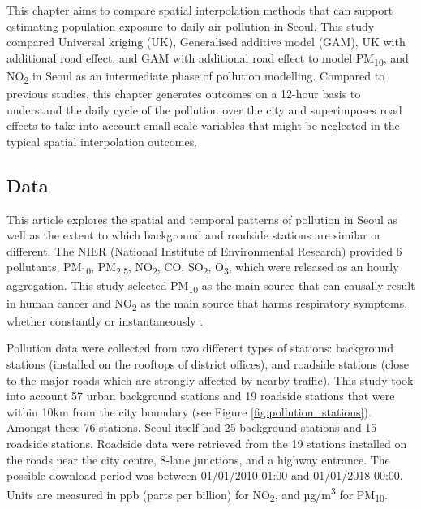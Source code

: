 This chapter aims to compare spatial interpolation methods that can
support estimating population exposure to daily air pollution in Seoul.
This study compared Universal kriging (UK), Generalised additive model
(GAM), UK with additional road effect, and GAM with additional road
effect to model PM\textsubscript{10}, and NO\textsubscript{2} in Seoul
as an intermediate phase of pollution modelling. Compared to previous
studies, this chapter generates outcomes on a 12-hour basis to
understand the daily cycle of the pollution over the city and
superimposes road effects to take into account small scale variables
that might be neglected in the typical spatial interpolation outcomes.

\hypertarget{data}{%
\subsection{Data}\label{data}}

This article explores the spatial and temporal patterns of pollution in
Seoul as well as the extent to which background and roadside stations
are similar or different. The NIER (National Institute of Environmental
Research) provided 6 pollutants, PM\textsubscript{10},
PM\textsubscript{2.5}, NO\textsubscript{2}, CO, SO\textsubscript{2},
O\textsubscript{3}, which were released as an hourly aggregation. This
study selected PM\textsubscript{10} as the main source that can causally
result in human cancer and NO\textsubscript{2} as the main source that
harms respiratory symptoms, whether constantly or instantaneously
\citep{WHO2013}.

Pollution data were collected from two different types of stations:
background stations (installed on the rooftops of district offices), and
roadside stations (close to the major roads which are strongly affected
by nearby traffic). This study took into account 57 urban background
stations and 19 roadside stations that were within 10km from the city
boundary (see Figure \ref{fig:pollution_stations}). Amongst these 76
stations, Seoul itself had 25 background stations and 15 roadside
stations. Roadside data were retrieved from the 19 stations installed on
the roads near the city centre, 8-lane junctions, and a highway
entrance. The possible download period was between 01/01/2010 01:00 and
01/01/2018 00:00. Units are measured in ppb (parts per billion) for
NO\textsubscript{2}, and µg/m\textsuperscript{3} for
PM\textsubscript{10}.

